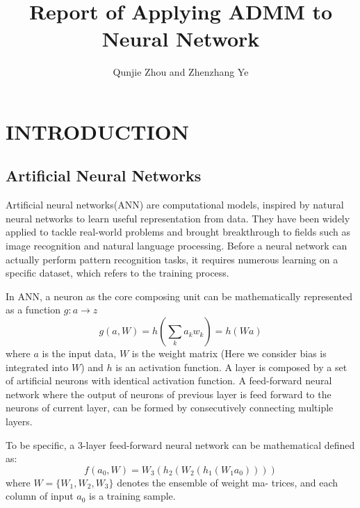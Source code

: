 \documentclass[letterpaper, 10 pt, conference]{ieeeconf}  %
\title{\LARGE \bf
Report of Applying ADMM to Neural Network
}
\author{Qunjie Zhou and Zhenzhang Ye%
}
\begin{document}
\maketitle
\thispagestyle{empty}
\pagestyle{empty}

\section{INTRODUCTION}
\subsection{Artificial Neural Networks} 
Artificial neural networks(ANN) are computational models, inspired by natural neural networks to learn useful representation from data. They have been widely applied to tackle real-world problems and brought breakthrough to fields such as image recognition and natural language processing.  Before a neural network can actually perform pattern recognition tasks, it requires numerous learning on a specific dataset, which refers to the training process.
 
 In ANN, a neuron as the core composing unit can be mathematically represented as a function $g: a \rightarrow z$
 \begin{equation}
	g(a, W)= h(\displaystyle\sum_{k}a_kw_k) = h(Wa)
\end{equation}
where $a$ is the input data, $W$ is the weight matrix (Here we consider bias is integrated into $W$) and $h$ is an activation function\cite{1}. A layer is composed by a set of artificial neurons with identical activation function. A feed-forward neural network where the output of neurons of previous layer is feed forward to the neurons of current layer, can be formed by consecutively connecting multiple layers.

To be specific, a 3-layer feed-forward neural network can be mathematical defined as:
\begin{equation} \label{eq:network}
	f(a_0, W) = W_3(h_2(W_2(h_1(W_1a_0))))
\end{equation}
where $W = \{W_1, W_2, W_3\}$ denotes the ensemble of weight ma- trices, and each column of input $a_0$ is a training sample.
\end{document}
